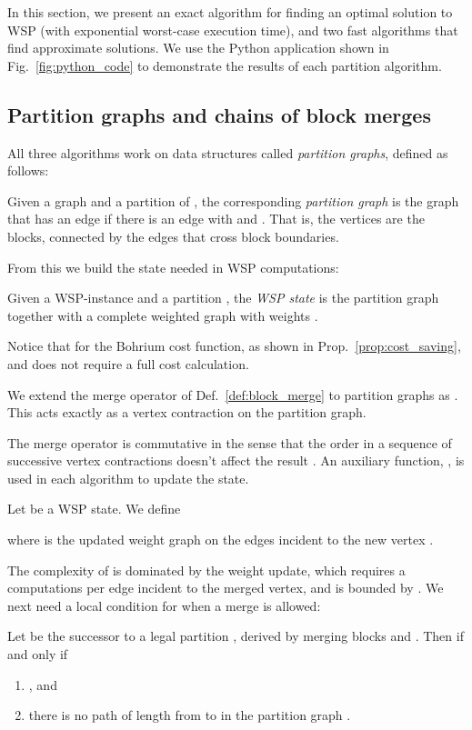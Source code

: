 In this section, we present an exact algorithm for finding an
optimal solution to WSP (with exponential worst-case execution time),
and two fast algorithms that find approximate solutions. We
use the Python application shown in Fig.~\ref{fig:python_code} to
demonstrate the results of each partition algorithm.

\subsection{Partition graphs and chains of block merges}
All three algorithms work on data structures called {\em partition
  graphs}, defined as follows:
\begin{definition}
  Given a graph  and a partition  of , the
  corresponding {\em partition graph} is the graph  that has an edge  if there is an
  edge  with  and . That is, the vertices
  are the blocks, connected by the edges that cross block boundaries.
\end{definition}
\noindent
From this we build the state needed in WSP computations:
\begin{definition}
  Given a WSP-instance  and a partition ,
  the {\em WSP state} is the partition graph  together with a complete weighted
  graph  with weights .
\end{definition}
Notice that  for the Bohrium cost
function, as shown in Prop.~\ref{prop:cost_saving}, and does not
require a full cost calculation.
\begin{definition}
  We extend the merge operator of Def.~\ref{def:block_merge} to
  partition graphs as .  This acts exactly as a vertex contraction
  on the partition graph.
\end{definition}
The merge operator is commutative in the sense that the order in a
sequence of successive vertex contractions doesn't affect the result \cite{wolle2004note}.
An auxiliary function, , is used in each algorithm to update the state.
\begin{definition}
  Let  be a WSP state. We define
  
  where  is the updated weight graph on the edges
  incident to the new vertex .
\end{definition}
The complexity of  is dominated by the weight update, which requires
a  computations per edge incident to the merged vertex,
and is bounded by . We next need a local condition for when
a merge is allowed:
\begin{lemma}
  \label{lem:legal_partition_merge}
  Let  be the successor to a legal
  partition , derived by merging blocks  and
  .  Then  if and only if
  \begin{enumerate}
  \item , and
  \item there is no path of length  from  to  in the
        partition graph .
  \end{enumerate}
\end{lemma}
